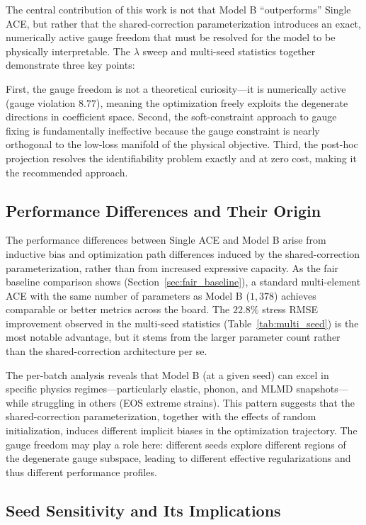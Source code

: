 \documentclass[twoside,prb,aps,floatfix,superscriptaddress,longbibliography]{revtex4-2}
\begin{document}
The central contribution of this work is not that Model B ``outperforms'' Single ACE, but rather that the shared-correction parameterization introduces an exact, numerically active gauge freedom that must be resolved for the model to be physically interpretable. The $\lambda$ sweep and multi-seed statistics together demonstrate three key points:

First, the gauge freedom is not a theoretical curiosity---it is numerically active (gauge violation $8.77$), meaning the optimization freely exploits the degenerate directions in coefficient space. Second, the soft-constraint approach to gauge fixing is fundamentally ineffective because the gauge constraint is nearly orthogonal to the low-loss manifold of the physical objective. Third, the post-hoc projection resolves the identifiability problem exactly and at zero cost, making it the recommended approach.

\subsection{Performance Differences and Their Origin}

The performance differences between Single ACE and Model B arise from inductive bias and optimization path differences induced by the shared-correction parameterization, rather than from increased expressive capacity. As the fair baseline comparison shows (Section~\ref{sec:fair_baseline}), a standard multi-element ACE with the same number of parameters as Model B ($1{,}378$) achieves comparable or better metrics across the board. The $22.8\%$ stress RMSE improvement observed in the multi-seed statistics (Table~\ref{tab:multi_seed}) is the most notable advantage, but it stems from the larger parameter count rather than the shared-correction architecture per se.

The per-batch analysis reveals that Model B (at a given seed) can excel in specific physics regimes---particularly elastic, phonon, and MLMD snapshots---while struggling in others (EOS extreme strains). This pattern suggests that the shared-correction parameterization, together with the effects of random initialization, induces different implicit biases in the optimization trajectory. The gauge freedom may play a role here: different seeds explore different regions of the degenerate gauge subspace, leading to different effective regularizations and thus different performance profiles.

\subsection{Seed Sensitivity and Its Implications}
\end{document}
